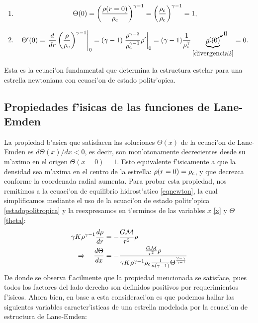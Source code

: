 \begin{enumerate}
 \item \begin{equation}\label{bcs_laneemden1}
\Theta(0)=\left(\frac{\rho(r=0)}{\rho_{\rm c}}\right)^{\gamma-1}=\left(\frac{\rho_{\rm c}}{\rho_{\rm c}}\right)^{\gamma-1}=1,
\end{equation}

\item
\begin{equation}\label{bcs_laneemden2}
\Theta'(0)=\left.\frac{d}{dr}\left(\frac{\rho}{\rho_{\rm c}}\right)^{\gamma-1}\right|_{0}=(\gamma-1)\left.\frac{\rho^{\gamma-2}}{\rho_{\rm c}^{\gamma-1}}\rho'\right|_0=(\gamma-1)\frac{1}{\rho_{\rm c}^{\gamma}}\underbrace{\cancelto{0}{\rho'(0)}}_{ \eqref{divergencia2}}=0.
\end{equation}
\end{enumerate}
Esta es la ecuaci'on fundamental que determina la estructura estelar para una estrella newtoniana con ecuaci'on de estado politr'opica.



\subsection{Propiedades f'isicas de las funciones de Lane-Emden}

La propiedad b'asica que satisfacen las soluciones $\Theta(x)$ de la ecuaci'on de Lane-Emden es $d\Theta(x)/dx<0$, es decir, son mon'otonamente decrecientes desde su m'aximo en el origen $\Theta(x=0)=1$. Esto equivalente f'isicamente a que la densidad sea m'axima en el centro de la estrella: $\rho(r=0)=\rho_{\rm c}$, y que decrezca conforme la coordenada radial aumenta. Para probar esta propiedad, nos remitimos a la ecuaci'on de equilibrio hidrost'atico \eqref{eqnewton}, la cual simplificamos mediante el uso de la ecuaci'on de estado politr'opica \eqref{estadopolitropica} y la reexpresamos en t'erminos de las variables $x$ \eqref{x} y $\Theta$ \eqref{theta}:
\begin{align}
\gamma K\rho^{\gamma-1}\frac{d\rho}{dr}&=-\frac{G\mathcal{M}}{r^2}\rho\\
\Rightarrow\quad \frac{d\Theta}{dx}&=-\frac{\frac{G\mathcal{M}}{r^2}\rho}{\gamma K \rho^{\gamma-1}\rho_{\rm c}\frac{1}{a(\gamma-1)}\Theta^{\frac{2-\gamma}{\gamma-1}}}\label{theta-decreciente}
\end{align}
De donde se observa f'acilmente que la propiedad mencionada se satisface, pues todos los factores del lado derecho son definidos positivos por requerimientos f'isicos. Ahora bien, en base a esta consideraci'on es que podemos hallar las siguientes variables caracter'isticas de una estrella modelada por la ecuaci'on de estructura de Lane-Emden:

